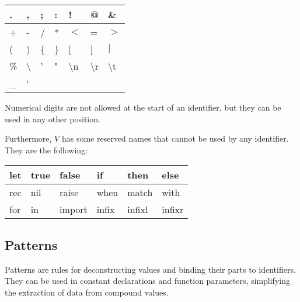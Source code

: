 \documentclass{article}
\begin{document}
\medskip

\begin{tabular}{|l|l|l|l|l|l|l|}
  \hline
  . & , & ; & : & ! & @ & \&\\
  \hline
  + & - & / & * & $<$ & = & $>$ \\
  \hline
  ( & ) & \{ & \} & [ & ] & $|$ \\
  \hline
  \% & \textbackslash & ' & " & \textbackslash n & \textbackslash r & \textbackslash t\\
  \hline
  \_ & \lq\\
  \hline
\end{tabular}

\bigskip

Numerical digits are not allowed at the start of an identifier, but they can be used in any other position.

Furthermore, $V$ has some reserved names that cannot be used by any identifier.
They are the following:

\medskip

\begin{tabular}{|l|l|l|l|l|l|}
  \hline
  let & true & false & if & then & else\\
  \hline
  rec & nil & raise & when & match & with\\
  \hline
  for & in & import & infix & infixl & infixr\\
  \hline
\end{tabular}

\subsection{Patterns}

Patterns are rules for deconstructing values and binding their parts to identifiers.
They can be used in constant declarations and function parameters, simplifying the extraction of data from compound values.

\medskip
\end{document}
